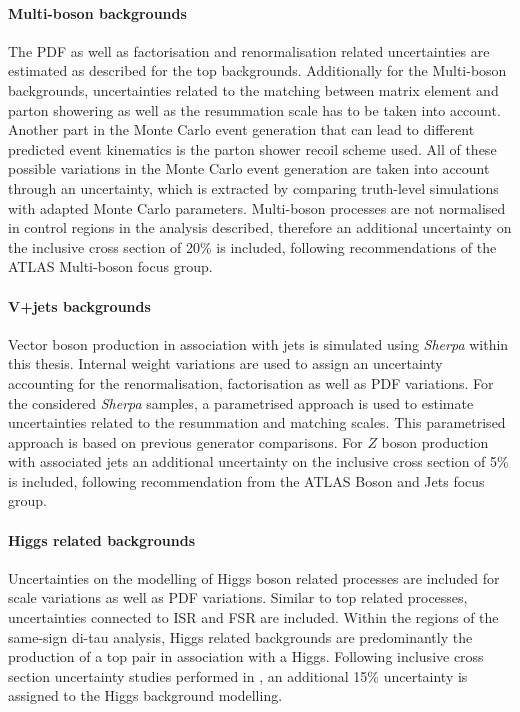 \paragraph{Multi-boson backgrounds}
The \ac{PDF} as well as factorisation and renormalisation related uncertainties are estimated as described for the top backgrounds. 
Additionally for the Multi-boson backgrounds, uncertainties related to the matching between matrix element and parton showering as well as the resummation scale has to be taken into account.  Another part in the Monte Carlo event generation that can lead to different predicted event kinematics is the parton shower recoil scheme used. 
All of these possible variations in the Monte Carlo event generation are taken into account through an uncertainty,  which is extracted by comparing truth-level simulations with adapted Monte Carlo parameters.  Multi-boson processes are not normalised in control regions in the analysis described, therefore an additional uncertainty on the inclusive cross section of 20\% is included,  following recommendations of the ATLAS Multi-boson focus group.

\paragraph{V+jets backgrounds}
Vector boson production in association with jets is simulated using \textit{Sherpa} within this thesis.  Internal weight variations are used to assign an uncertainty accounting for the renormalisation, factorisation as well as PDF variations. 
For the considered \textit{Sherpa} samples,  a parametrised approach is used to estimate uncertainties related to the resummation and matching scales.  This parametrised approach is based on previous generator comparisons.
For $Z$ boson production with associated jets an additional uncertainty on the inclusive cross section of 5\% is included, following recommendation from the ATLAS Boson and Jets focus group.

\paragraph{Higgs related backgrounds}
Uncertainties on the modelling of Higgs boson related processes are included for scale variations as well as PDF variations.  Similar to top related processes, uncertainties connected to \ac{ISR} and \ac{FSR} are included.
Within the regions of the same-sign di-tau analysis,  Higgs related backgrounds are predominantly the production of a top pair in association with a Higgs. Following inclusive cross section uncertainty studies performed in \cite{CERNYellowReportHiggs},  an additional 15\% uncertainty is assigned to the Higgs background modelling. 


